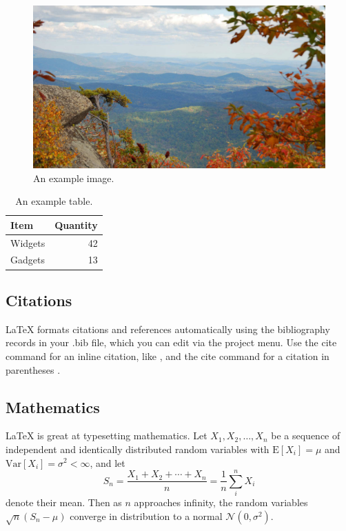\documentclass[fleqn,10pt]{ncc} %
\begin{document}
\begin{figure}[ht]
\centering
\includegraphics[width=\linewidth]{view}
\caption{An example image.}
\label{fig:view}
\end{figure}

\begin{table}[ht]
\centering
\begin{tabular}{l|r}
Item & Quantity \\\hline
Widgets & 42 \\
Gadgets & 13
\end{tabular}
\caption{\label{tab:widgets}An example table.}
\end{table}

\subsection{Citations}

LaTeX formats citations and references automatically using the bibliography records in your .bib file, which you can edit via the project menu. Use the cite command for an inline citation, like \cite{hirsch2005index}, and the cite command for a citation in parentheses \cite{morone2015influence,hirsch2005index,dangalchev2006residual,garg2015brief}.

\subsection{Mathematics}

\LaTeX{} is great at typesetting mathematics. Let $X_1, X_2, \ldots, X_n$ be a sequence of independent and identically distributed random variables with $\text{E}[X_i] = \mu$ and $\text{Var}[X_i] = \sigma^2 < \infty$, and let
$$S_n = \frac{X_1 + X_2 + \cdots + X_n}{n}
      = \frac{1}{n}\sum_{i}^{n} X_i$$
denote their mean. Then as $n$ approaches infinity, the random variables $\sqrt{n}(S_n - \mu)$ converge in distribution to a normal $\mathcal{N}(0, \sigma^2)$.
\end{document}
